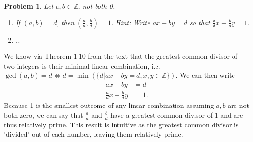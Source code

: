 \documentclass[12pt]{article}
\newtheorem{problem}{Problem}
\theoremstyle{remark}  %
\begin{document}
\setcounter{problem}{18}
    \begin{problem}
        Let $a,b\in\mathbb{Z}$, not both 0.
        \begin{enumerate}[label=(\alph*)]
            \item If $(a,b)=d$, then $\left(\frac{a}{d},\frac{b}{d}\right)=1$. Hint: Write $ax+by=d$ so that $\frac{a}{d}x+\frac{b}{d}y=1$.
            \item \dots
        \end{enumerate}
    \end{problem}
    We know via Theorem 1.10 from the text that the greatest common divisor of two integers is their minimal linear combination, i.e. $\gcd(a,b)=d\iff d=\min(\{d|ax+by=d, x,y\in\mathbb{Z}\})$. We can then write
    \begin{align*}
        ax+by &= d \\
        \frac{a}{d}x+\frac{b}{d}y &= 1.
    \end{align*}
    Because 1 is the smallest outcome of any linear combination assuming $a,b$ are not both zero, we can say that $\frac{a}{d}$ and $\frac{b}{d}$ have a greatest common divisor of 1 and are thus relatively prime. This result is intuitive as the greatest common divisor is 'divided' out of each number, leaving them relatively prime.


\iffalse
\end{document}
